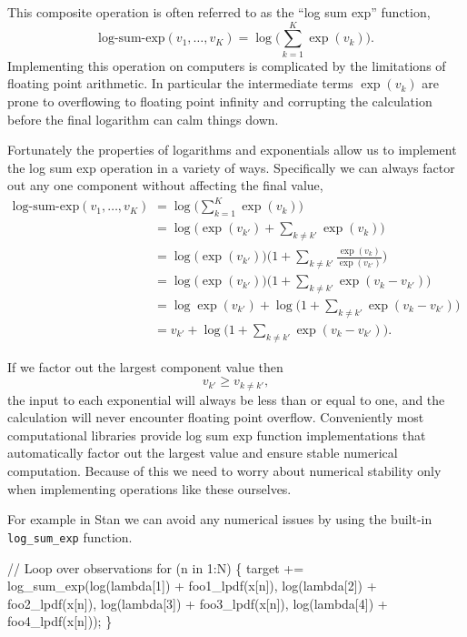 \documentclass[
  letterpaper,
  DIV=11,
  numbers=noendperiod]{scrartcl}
\newenvironment{Shaded}{\begin{snugshade}}{\end{snugshade}}
\newcommand{\CommentTok}[1]{\textcolor[rgb]{0.37,0.37,0.37}{#1}}
\newcommand{\ControlFlowTok}[1]{\textcolor[rgb]{0.00,0.23,0.31}{#1}}
\newcommand{\DecValTok}[1]{\textcolor[rgb]{0.68,0.00,0.00}{#1}}
\newcommand{\KeywordTok}[1]{\textcolor[rgb]{0.00,0.23,0.31}{#1}}
\newcommand{\NormalTok}[1]{\textcolor[rgb]{0.00,0.23,0.31}{#1}}
\begin{document}
This composite operation is often referred to as the ``log sum exp''
function, \[
\text{log-sum-exp}(v_{1}, \ldots, v_{K})
=
\log \bigg( \sum_{k = 1}^{K} \exp (v_{k}) \bigg).
\] Implementing this operation on computers is complicated by the
limitations of floating point arithmetic. In particular the intermediate
terms \(\exp(v_{k})\) are prone to overflowing to floating point
infinity and corrupting the calculation before the final logarithm can
calm things down.

Fortunately the properties of logarithms and exponentials allow us to
implement the log sum exp operation in a variety of ways. Specifically
we can always factor out any one component without affecting the final
value, \begin{align*}
\text{log-sum-exp}(v_{1}, \ldots, v_{K})
&=
\log \bigg( \sum_{k = 1}^{K} \exp (v_{k}) \bigg)
\\
&=
\log \bigg( \exp (v_{k'}) + \sum_{k \ne k'} \exp (v_{k}) \bigg)
\\
&=
\log \bigg( \exp (v_{k'}) \bigg)
\bigg(1 + \sum_{k \ne k'} \frac{ \exp (v_{k}) }{ \exp (v_{k'}) } \bigg)
\\
&=
\log \bigg( \exp (v_{k'}) \bigg)
\bigg(1 + \sum_{k \ne k'} \exp (v_{k} - v_{k'}) \bigg)
\\
&=
\log \exp (v_{k'})
+ \log \bigg(1 + \sum_{k \ne k'} \exp (v_{k} - v_{k'}) \bigg)
\\
&=
v_{k'} + \log \bigg(1 + \sum_{k \ne k'} \exp (v_{k} - v_{k'}) \bigg).
\end{align*}

If we factor out the largest component value then \[
v_{k'} \ge v_{k \ne k'},
\] the input to each exponential will always be less than or equal to
one, and the calculation will never encounter floating point overflow.
Conveniently most computational libraries provide log sum exp function
implementations that automatically factor out the largest value and
ensure stable numerical computation. Because of this we need to worry
about numerical stability only when implementing operations like these
ourselves.

For example in Stan we can avoid any numerical issues by using the
built-in \texttt{log\_sum\_exp} function.

\begin{Shaded}
\begin{Highlighting}[]
\CommentTok{// Loop over observations}
\ControlFlowTok{for}\NormalTok{ (n }\ControlFlowTok{in} \DecValTok{1}\NormalTok{:N) \{}
  \KeywordTok{target +=}\NormalTok{ log\_sum\_exp(log(lambda[}\DecValTok{1}\NormalTok{]) + foo1\_lpdf(x[n]),}
\NormalTok{                        log(lambda[}\DecValTok{2}\NormalTok{]) + foo2\_lpdf(x[n]),}
\NormalTok{                        log(lambda[}\DecValTok{3}\NormalTok{]) + foo3\_lpdf(x[n]),}
\NormalTok{                        log(lambda[}\DecValTok{4}\NormalTok{]) + foo4\_lpdf(x[n]));}
\NormalTok{\}}
\end{Highlighting}
\end{Shaded}
\end{document}
